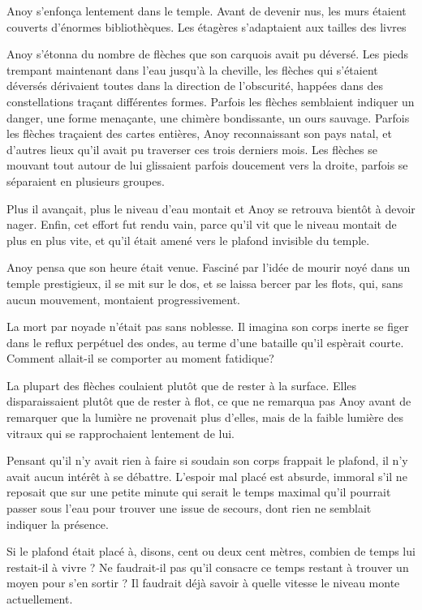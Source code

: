 Anoy s'enfonça lentement dans le temple. Avant de devenir nus,
les murs étaient couverts d'énormes bibliothèques. Les étagères
s'adaptaient aux tailles des livres

Anoy s'étonna du nombre de flèches que son carquois avait pu
déversé. Les pieds trempant maintenant dans l'eau jusqu'à la cheville,
les flèches qui s'étaient déversés dérivaient toutes dans la direction
de l'obscurité, happées dans des constellations traçant différentes
formes. Parfois les flèches semblaient indiquer un danger, une forme
menaçante, une chimère bondissante, un ours sauvage. Parfois les
flèches traçaient des cartes entières, Anoy reconnaissant son pays
natal, et d'autres lieux qu'il avait pu traverser ces trois derniers
mois. Les flèches se mouvant tout autour de lui glissaient parfois
doucement vers la droite, parfois se séparaient en plusieurs groupes.

Plus il avançait, plus le niveau d'eau montait et Anoy se retrouva
bientôt à devoir nager. Enfin, cet effort fut rendu vain, parce qu'il
vit que le niveau montait de plus en plus vite, et qu'il était amené
vers le plafond invisible du temple.

Anoy pensa que son heure était venue. Fasciné par l'idée de mourir
noyé dans un temple prestigieux, il se mit sur le dos, et se laissa
bercer par les flots, qui, sans aucun mouvement, montaient
progressivement.

La mort par noyade n'était pas sans noblesse. Il imagina son corps
inerte se figer dans le reflux perpétuel des ondes, au terme d'une
bataille qu'il espèrait courte. Comment allait-il se comporter au
moment fatidique? 

La plupart des flèches coulaient plutôt que de rester à la
surface. Elles disparaissaient plutôt que de rester à flot, ce que ne
remarqua pas Anoy avant de remarquer que la lumière ne provenait plus
d'elles, mais de la faible lumière des vitraux qui se rapprochaient
lentement de lui.

Pensant qu'il n'y avait rien à faire si soudain son corps frappait le
plafond, il n'y avait aucun intérêt à se débattre. L'espoir mal placé
est absurde, immoral s'il ne reposait que sur une petite minute qui
serait le temps maximal qu'il pourrait passer sous l'eau pour trouver
une issue de secours, dont rien ne semblait indiquer la présence.

Si le plafond était placé à, disons, cent ou deux cent mètres, combien
de temps lui restait-il à vivre ? Ne faudrait-il pas qu'il consacre ce
temps restant à trouver un moyen pour s'en sortir ? Il faudrait déjà
savoir à quelle vitesse le niveau monte actuellement.

